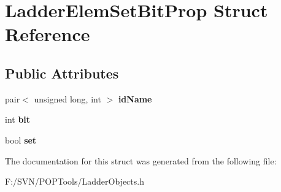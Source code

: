 \hypertarget{struct_ladder_elem_set_bit_prop}{\section{Ladder\-Elem\-Set\-Bit\-Prop Struct Reference}
\label{struct_ladder_elem_set_bit_prop}
}
\subsection*{Public Attributes}
\begin{DoxyCompactItemize}
\item 
\hypertarget{struct_ladder_elem_set_bit_prop_a96851f82bdbd10e0b4589229ddd93ea2}{pair$<$ unsigned long, int $>$ {\bfseries id\-Name}}\label{struct_ladder_elem_set_bit_prop_a96851f82bdbd10e0b4589229ddd93ea2}

\item 
\hypertarget{struct_ladder_elem_set_bit_prop_abde23362872741a5565a4aa36fbe1a52}{int {\bfseries bit}}\label{struct_ladder_elem_set_bit_prop_abde23362872741a5565a4aa36fbe1a52}

\item 
\hypertarget{struct_ladder_elem_set_bit_prop_a61189db763c9eae18ace42a69529887e}{bool {\bfseries set}}\label{struct_ladder_elem_set_bit_prop_a61189db763c9eae18ace42a69529887e}

\end{DoxyCompactItemize}


The documentation for this struct was generated from the following file\-:\begin{DoxyCompactItemize}
\item 
F\-:/\-S\-V\-N/\-P\-O\-P\-Tools/Ladder\-Objects.\-h\end{DoxyCompactItemize}
